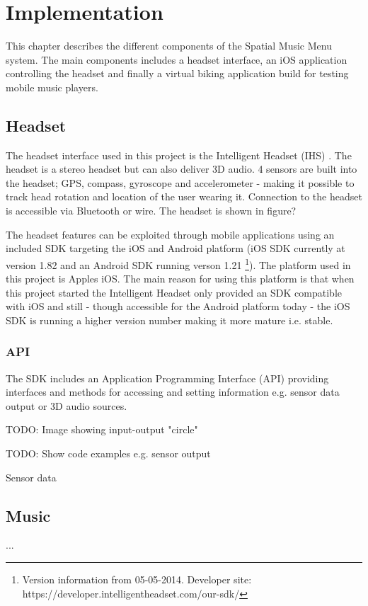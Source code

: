 \chapter{Implementation}
This chapter describes the different components of the Spatial Music Menu system. The main components includes a headset interface, an iOS application controlling the headset and finally a virtual biking application build for testing mobile music players.

\section{Headset}
The headset interface used in this project is the Intelligent Headset (IHS) \cite{gn_store_nord_intelligent_2013}. The headset is a stereo headset but can also deliver 3D audio. 4 sensors are built into the headset; GPS, compass, gyroscope and accelerometer - making it possible to track head rotation and location of the user wearing it. Connection to the headset is accessible via Bluetooth or wire. The headset is shown in figure?

The headset features can be exploited through mobile applications using an included SDK targeting the iOS and Android platform (iOS SDK currently at version 1.82 and an Android SDK running verson 1.21 \footnote{Version information from 05-05-2014. Developer site: https://developer.intelligentheadset.com/our-sdk/}). The platform used in this project is Apples iOS. The main reason for using this platform is that when this project started the Intelligent Headset only provided an SDK compatible with iOS and still - though accessible for the Android platform today - the iOS SDK is running a higher version number making it more mature i.e. stable.

\subsection{API}
The SDK includes an Application Programming Interface (API) providing interfaces and methods for accessing and setting information e.g. sensor data output or 3D audio sources.

TODO: Image showing input-output "circle"

TODO: Show code examples e.g. sensor output

Sensor data


\section{Music}
...


